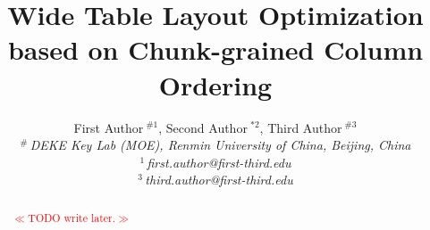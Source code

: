 \documentclass[10pt,conference,letterpaper]{IEEEtran}
\title{Wide Table Layout Optimization based on Chunk-grained Column Ordering}
\author{%
{First Author{\small $~^{\#1}$}, Second Author{\small $~^{*2}$}, Third Author{\small $~^{\#3}$} }%
\vspace{1.6mm}\\
\fontsize{10}{10}\selectfont\itshape
$^{\#}$\,DEKE Key Lab (MOE), Renmin University of China, Beijing, China\\
\fontsize{9}{9}\selectfont\ttfamily\upshape
%
$^{1}$\,first.author@first-third.edu\\
$^{3}$\,third.author@first-third.edu%
}
\newcommand{\todo}[1]{{\footnotesize \textcolor{red}{$\ll$\textsf{TODO #1}$\gg$}}}
\begin{document}
\maketitle
%
\begin{abstract} 
\todo{write later.}
\end{abstract}


%





















% 
\end{document}
